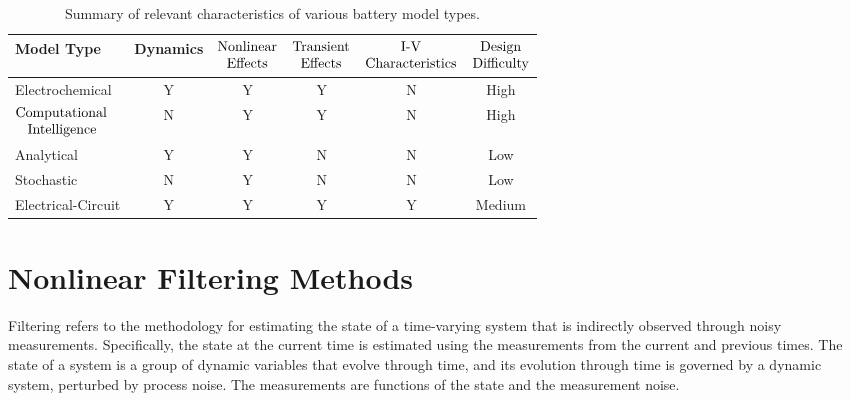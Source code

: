\documentclass[../zhang_thesis.tex]{subfiles}
\begin{document}
\begin{table}[htb]
\centering
\caption{Summary of relevant characteristics of various battery model types.}
\begin{tabular}{lccccc}
    \toprule
    Model Type & Dynamics & $\vcenter{\setbox0\hbox{\strut Nonlinear}\copy0\hbox to\wd0{\hss\strut Effects\hss}}$ & $\vcenter{\setbox0\hbox{\strut Transient}\copy0\hbox to\wd0{\hss\strut Effects\hss}}$ & $\vcenter{\setbox0\hbox{\strut Characteristics}\hbox to\wd0{\hss\strut I-V\hss}\copy0}$ & $\vcenter{\setbox0\hbox{\strut Difficulty}\hbox to\wd0{\hss\strut Design\hss}\copy0}$ \\
    \midrule
	Electrochemical & Y & Y & Y & N & High \\
    $\vcenter{\setbox0\hbox{\strut Computational\strut}\copy0\hbox to\wd0{\hspace{2ex}\strut Intelligence\hss}}$ & N & Y & Y & N & High \\
    Analytical & Y & Y & N & N & Low \\
    Stochastic & N & Y & N & N & Low \\
    Electrical-Circuit & Y & Y & Y & Y & Medium \\
    \bottomrule
\end{tabular}
\label{tab:model_charac}
\end{table}


\section{Nonlinear Filtering Methods}

Filtering refers to the methodology for estimating the state of a time-varying system that is indirectly observed through noisy measurements. Specifically, the state at the current time is estimated using the measurements from the current and previous times. The state of a system is a group of dynamic variables that evolve through time, and its evolution through time is governed by a dynamic system, perturbed by process noise. The measurements are functions of the state and the
measurement noise.
\end{document}
